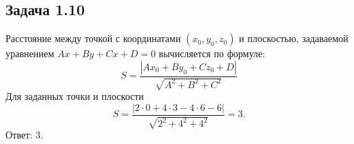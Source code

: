 \documentclass[12pt]{article}
\begin{document}
\subsection*{Задача 1.10}
Расстояние между точкой с координатами $(x_0, y_0, z_0)$ и плоскостью, задаваемой уравнением $Ax + By + Cx + D = 0$ вычисляется по формуле:
$$S = \frac{|Ax_0+By_0+Cz_0 + D|}{\sqrt{A^2+B^2+C^2}}$$
Для заданных точки и плоскости $$S = \frac{|2 \cdot 0 + 4 \cdot 3 - 4 \cdot 6 - 6|}{\sqrt{2^2 + 4^2 + 4^2}} = 3.$$ Ответ: 3.
\end{document}
